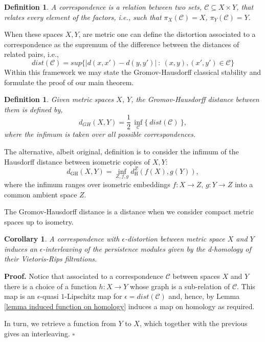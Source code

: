 \documentclass[11pt]{article}
\newtheorem{cor}[thm]{Corollary}
\newtheorem{defn}[thm]{Definition}
\newenvironment{pf}[1][Proof]{\noindent\textbf{#1.} }{ \hfill$\square$\medskip}
\newcommand{\C}{\mathcal{C}}
\begin{document}
\begin{defn}
    A correspondence is a relation between two sets, $\C\subseteq X\times Y$, that relates every element of the factors, i.e., such that $\pi_X(\C)=X$, $\pi_Y(\C)=Y$.
\end{defn}
When these spaces $X,Y$, are metric one can define the distortion associated to a correspondence as the supremum of the difference between the distances of related pairs, i.e., 
\begin{equation}\label{eq distortion defn}
dist(\C)= sup \Bigg\{ |d(x,x')-d(y,y')|  ~:~(x,y),(x',y')\in \C \Bigg\}    
\end{equation}
Within this framework we may state the Gromov-Hausdorff classical stability and formulate the proof of our main theorem.  
\begin{defn} 
Given metric spaces $X$, $Y$, the Gromov-Hausdorff distance between them is defined by, 
\[ d_{GH}(X,Y) = \frac{1}{2} \, \underset{\C}{\inf} \{\!~dist(\C)\!~\}, \]
where the infimum is taken over all possible correspondences. 
\end{defn}
The alternative, albeit original, definition is to consider the infimum of the Hausdorff distance between isometric copies of $X,Y$:  
\[ d_{\mathrm{GH}}(X,Y) = \inf_{Z,f,g} d_{\mathrm{H}}^Z(f(X), g(Y)), \]
where the infimum ranges over isometric embeddings $f: X \to Z$, $g: Y \to Z$ into a common ambient space $Z$.

The Gromov-Hausdorff distance is a distance when we consider compact metric spaces up to isometry. 

\begin{cor}  
A correspondence with $\epsilon$-distortion between metric space $X$ and $Y$ induces an \mbox{$\epsilon$-interleaving} of the persistence modules given by the d-homology of their Vietoris-Rips filtrations.
\end{cor}
\begin{pf}
Notice that associated to a correspondence $\C$ between spaces $X$ and $Y$ there is a choice of a function $h:X\to Y$ whose graph is a sub-relation of $\C$.
This map is an $\epsilon$-quasi $1$-Lipschitz map for $\epsilon=dist(\C)$ and, hence, by Lemma \ref{lemma induced function on homology} induces a map on homology as required. 

In turn, we retrieve a function from $Y$ to $X$, which together with the previous gives an interleaving.  
\end{pf}
\end{document}
